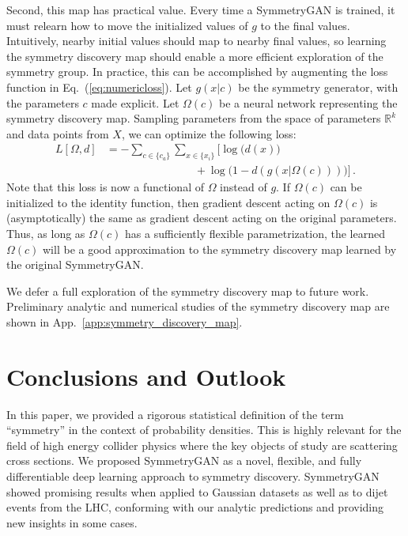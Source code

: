 \documentclass[aps,prx,reprint,preprintnumbers,superscriptaddress,nofootinbib,longbibliography,floatfix]{revtex4-1}
\newcommand{\R}{\mathbb{R}}
\DeclareRobustCommand{\App}[1]{App.~\ref{app:#1}}
\DeclareRobustCommand{\Eq}[1]{Eq.~(\ref{eq:#1})}
\begin{document}
Second, this map has practical value.
%
Every time a SymmetryGAN is trained, it must relearn how to move the initialized values of $g$ to the final values.
%
Intuitively, nearby initial values should map to nearby final values, so learning the symmetry discovery map should enable a more efficient exploration of the symmetry group.
%
In practice, this can be accomplished by augmenting the loss function in \Eq{numericloss}.
%
Let $g(x|c)$ be the symmetry generator, with the parameters $c$ made explicit.
%
Let $\Omega(c)$ be a neural network representing the symmetry discovery map.
%
%
Sampling parameters from the space of parameters $\R^k$ and data points from $X$, we can optimize the following loss:
%
\begin{align}
\label{eq:numericloss_parameters}
    L[\Omega,d]&=-\sum_{c \in \{c_a\}} \sum_{x\in\{x_i\}}  \Big[\log\big(d(x)\big) \\
    & \nonumber \qquad \qquad \qquad \qquad + \log\big(1-d(g(x|\Omega(c)))\big)\Big]\,.
\end{align}
%
Note that this loss is now a functional of $\Omega$ instead of $g$.
%
If $\Omega(c)$ can be initialized to the identity function, then gradient descent acting on $\Omega(c)$ is (asymptotically) the same as gradient descent acting on the original parameters.
%
Thus, as long as $\Omega(c)$ has a sufficiently flexible parametrization, the learned $\Omega(c)$ will be a good approximation to the symmetry discovery map learned by the original SymmetryGAN.


We defer a full exploration of the symmetry discovery map to future work.
%
Preliminary analytic and numerical studies of the symmetry discovery map are shown in \App{symmetry_discovery_map}.


\section{Conclusions and Outlook}
\label{sec:conclusions}


%
In this paper, we provided a rigorous statistical definition of the term ``symmetry'' in the context of probability densities.
%
This is highly relevant for the field of high energy collider physics where the key objects of study are scattering cross sections.
%
We proposed SymmetryGAN as a novel, flexible, and fully differentiable deep learning approach to symmetry discovery.
%
SymmetryGAN showed promising results when applied to Gaussian datasets as well as to dijet events from the LHC, conforming with our analytic predictions and providing new insights in some cases.
\end{document}
